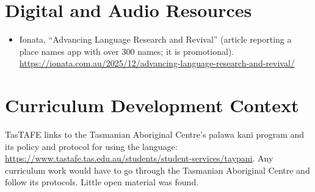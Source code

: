 \documentclass[12pt]{article}
\begin{document}
\section{Digital and Audio Resources}
\begin{itemize}
\item Ionata, ``Advancing Language Research and Revival'' (article reporting a place names app with over 300 names; it is promotional). \url{https://ionata.com.au/2025/12/advancing-language-research-and-revival/}
\end{itemize}

\section{Curriculum Development Context}
TasTAFE links to the Tasmanian Aboriginal Centre's palawa kani program and its policy and protocol for using the language: \url{https://www.tastafe.tas.edu.au/students/student-services/taypani}. Any curriculum work would have to go through the Tasmanian Aboriginal Centre and follow its protocols. Little open material was found.
\end{document}
